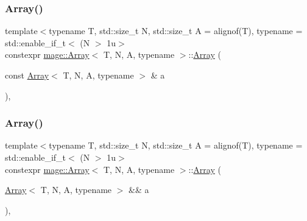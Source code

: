\mbox{\label{structmage_1_1_array_a8dc58948e15554f715b280a72140a1f4}} 
\subsubsection{\texorpdfstring{Array()}{Array()}\hspace{0.1cm}{\footnotesize\ttfamily [8/10]}}
{\footnotesize\ttfamily template$<$typename T, std\+::size\+\_\+t N, std\+::size\+\_\+t A = alignof(\+T), typename  = std\+::enable\+\_\+if\+\_\+t$<$ (\+N $>$ 1u$>$ \\
constexpr \mbox{\hyperlink{structmage_1_1_array}{mage\+::\+Array}}$<$ T, N, A, typename $>$\+::\mbox{\hyperlink{structmage_1_1_array}{Array}} (\begin{DoxyParamCaption}\item[{const \mbox{\hyperlink{structmage_1_1_array}{Array}}$<$ T, N, A, typename $>$ \&}]{a }\end{DoxyParamCaption})\hspace{0.3cm}{\ttfamily [default]}, {\ttfamily [noexcept]}}

\mbox{\label{structmage_1_1_array_a4cf0fb395b42d53b6e59868739dc9613}} 
\subsubsection{\texorpdfstring{Array()}{Array()}\hspace{0.1cm}{\footnotesize\ttfamily [9/10]}}
{\footnotesize\ttfamily template$<$typename T, std\+::size\+\_\+t N, std\+::size\+\_\+t A = alignof(\+T), typename  = std\+::enable\+\_\+if\+\_\+t$<$ (\+N $>$ 1u$>$ \\
constexpr \mbox{\hyperlink{structmage_1_1_array}{mage\+::\+Array}}$<$ T, N, A, typename $>$\+::\mbox{\hyperlink{structmage_1_1_array}{Array}} (\begin{DoxyParamCaption}\item[{\mbox{\hyperlink{structmage_1_1_array}{Array}}$<$ T, N, A, typename $>$ \&\&}]{a }\end{DoxyParamCaption})\hspace{0.3cm}{\ttfamily [default]}, {\ttfamily [noexcept]}}

\mbox{\label{structmage_1_1_array_a950b26208c3546704f42e92c312a93ed}} 
